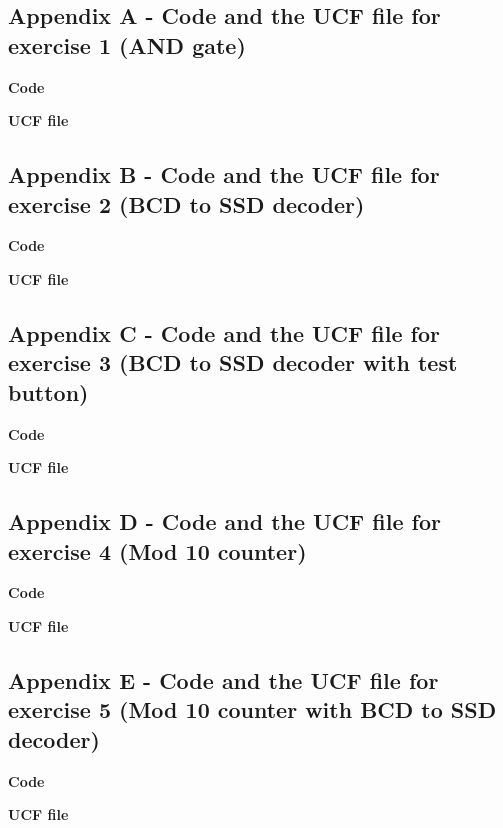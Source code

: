\subsection*{Appendix A - Code and the UCF file for exercise 1 (AND gate) }
\textbf{Code}

\textbf{UCF file}


\pagebreak

\subsection*{Appendix B - Code and the UCF file for exercise 2  (BCD to SSD decoder)}
\textbf{Code}

\textbf{UCF file}


\pagebreak

\subsection*{Appendix C - Code and the UCF file for exercise 3 (BCD to SSD decoder with test button)}
\textbf{Code}

\textbf{UCF file}


\pagebreak

\subsection*{Appendix D - Code and the UCF file for exercise 4 (Mod 10 counter)}
\textbf{Code}

\textbf{UCF file}


\pagebreak

\subsection*{Appendix E - Code and the UCF file for exercise 5 (Mod 10 counter with BCD to SSD decoder)}
\textbf{Code}

\textbf{UCF file}


